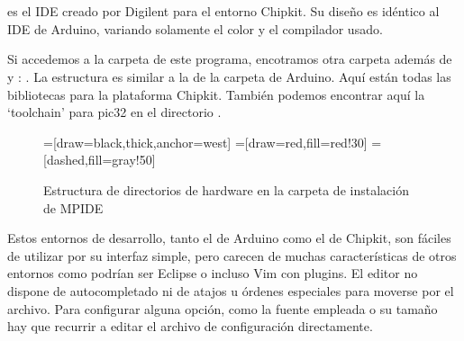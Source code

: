 \section{}
\cite{website:mpide} es el IDE creado por Digilent para el entorno Chipkit. Su diseño es idéntico al IDE de Arduino, variando solamente el color y el compilador usado.


Si accedemos a la carpeta  de este programa, encotramos otra carpeta además de  y : . La estructura es similar  a la de la carpeta de Arduino. Aquí están todas las bibliotecas para la plataforma Chipkit. También podemos encontrar aquí la `toolchain'  para pic32 en el directorio .

\begin{figure}
\begin{center}
=[draw=black,thick,anchor=west]
=[draw=red,fill=red!30]
=[dashed,fill=gray!50]
\end{center}
\caption{Estructura de directorios de hardware en la carpeta de instalación de MPIDE}
\label{mpide_carpetas}
\end{figure}

Estos entornos de desarrollo, tanto el de Arduino como el de Chipkit, son fáciles de utilizar por su interfaz simple, pero carecen de muchas características de otros entornos como podrían ser Eclipse o incluso Vim con plugins. El editor no dispone de autocompletado ni de atajos u órdenes especiales para moverse por el archivo. Para configurar alguna opción, como la fuente empleada o su tamaño hay que recurrir a editar el archivo de configuración directamente.

